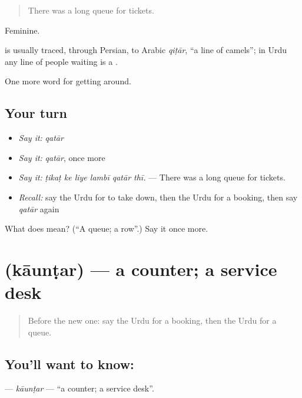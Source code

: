 \begin{quote}
There was a long queue for tickets.
\end{quote}

Feminine.

\begin{cousinweb}
is usually traced, through Persian, to Arabic \emph{qiṭār}, \textquotedblleft{}a line of camels\textquotedblright{}; in Urdu any line of people waiting is a \textbf{}.
\end{cousinweb}

\begin{grammarlens}[title={What you've built}]
One more word for getting around.
\end{grammarlens}

\subsection*{Your turn}
\begin{itemize}
\raggedright
  \item \emph{Say it:} \emph{qatār}
  \item \emph{Say it:} \emph{qatār}, once more
  \item \emph{Say it:} \emph{ṭikaṭ ke liye lambī qatār thī.} — There was a long queue for tickets.
  \item \emph{Recall:} say the Urdu for to take down, then the Urdu for a booking, then say \emph{qatār} again
\end{itemize}

\begin{tcolorbox}[breakable,colback=teal!4,colframe=teal!35!black,title={Before you move on}]
What does  mean? (\textquotedblleft{}A queue; a row\textquotedblright{}.) Say it once more.
\end{tcolorbox}
\section[\texorpdfstring{\ur{کاؤنٹر} (kāunṭar)}{کاؤنٹر (kāunṭar)}]{ (kāunṭar) — a counter; a service desk}

\label{lesson:UR-C391-kauntar}



\begin{quote}
Before the new one: say the Urdu for a booking, then the Urdu for a queue.
\end{quote}

\subsection*{You'll want to know: }
\textbf{} — \emph{kāunṭar} — \textquotedblleft{}a counter; a service desk\textquotedblright{}.

